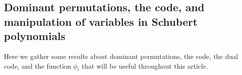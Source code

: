 \documentclass{amsart}
\newtheorem{corollary}[lemma]{Corollary}
\newtheorem{proposition}[lemma]{Proposition}
\theoremstyle{definition}
\theoremstyle{remark}
\numberwithin{equation}{subsection}
\newcommand{\dom}{\mathfrak{d}}
\newcommand{\ldom}{\dom^*}
\newcommand{\code}{\mathfrak{c}}
\begin{document}
\subsection{Dominant permutations, the code, and manipulation of variables in Schubert polynomials}

Here we gather some results about dominant permutations, the code, the dual code, and the function $\phi_i$ that will be useful throughout this article.






%
%
\end{document}
